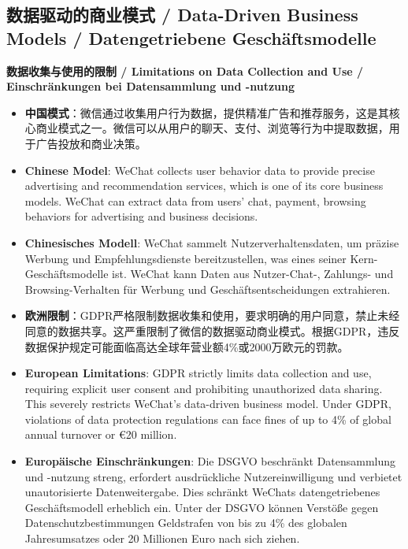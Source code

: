 \documentclass[11pt,a4paper]{article}
\begin{document}
\subsection{数据驱动的商业模式 / Data-Driven Business Models / Datengetriebene Geschäftsmodelle}

\textbf{数据收集与使用的限制 / Limitations on Data Collection and Use / Einschränkungen bei Datensammlung und -nutzung}

\begin{itemize}
    \item \textbf{中国模式}：微信通过收集用户行为数据，提供精准广告和推荐服务，这是其核心商业模式之一。微信可以从用户的聊天、支付、浏览等行为中提取数据，用于广告投放和商业决策。
    \item \textbf{Chinese Model}: WeChat collects user behavior data to provide precise advertising and recommendation services, which is one of its core business models. WeChat can extract data from users' chat, payment, browsing behaviors for advertising and business decisions.
    \item \textbf{Chinesisches Modell}: WeChat sammelt Nutzerverhaltensdaten, um präzise Werbung und Empfehlungsdienste bereitzustellen, was eines seiner Kern-Geschäftsmodelle ist. WeChat kann Daten aus Nutzer-Chat-, Zahlungs- und Browsing-Verhalten für Werbung und Geschäftsentscheidungen extrahieren.
    
    \item \textbf{欧洲限制}：GDPR严格限制数据收集和使用，要求明确的用户同意，禁止未经同意的数据共享。这严重限制了微信的数据驱动商业模式。根据GDPR，违反数据保护规定可能面临高达全球年营业额4\%或2000万欧元的罚款。
    \item \textbf{European Limitations}: GDPR strictly limits data collection and use, requiring explicit user consent and prohibiting unauthorized data sharing. This severely restricts WeChat's data-driven business model. Under GDPR, violations of data protection regulations can face fines of up to 4\% of global annual turnover or €20 million.
    \item \textbf{Europäische Einschränkungen}: Die DSGVO beschränkt Datensammlung und -nutzung streng, erfordert ausdrückliche Nutzereinwilligung und verbietet unautorisierte Datenweitergabe. Dies schränkt WeChats datengetriebenes Geschäftsmodell erheblich ein. Unter der DSGVO können Verstöße gegen Datenschutzbestimmungen Geldstrafen von bis zu 4\% des globalen Jahresumsatzes oder 20 Millionen Euro nach sich ziehen.
\end{itemize}
\end{document}
